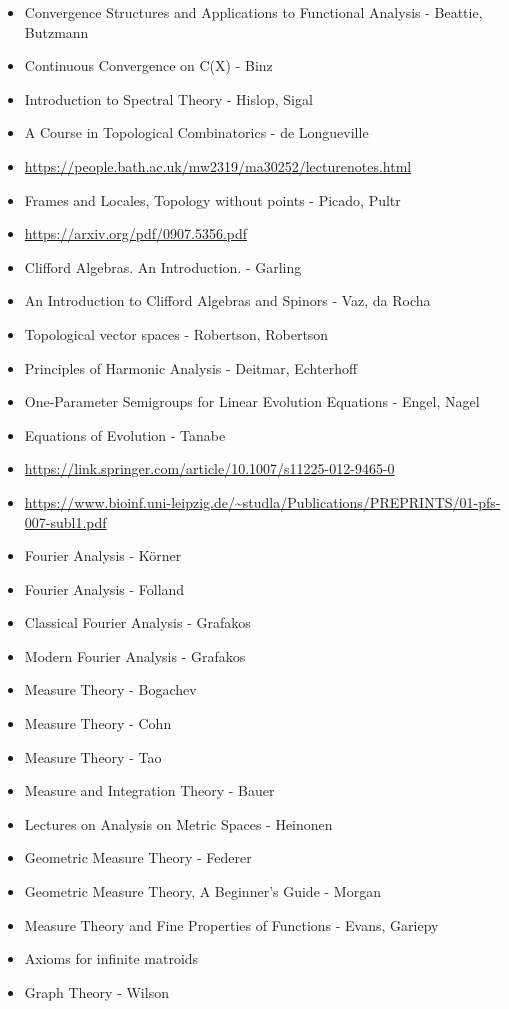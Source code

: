 \documentclass{report}
\begin{document}
\begin{itemize}
\item Convergence Structures and Applications to Functional Analysis - Beattie, Butzmann
\item Continuous Convergence on C(X) - Binz
\item Introduction to Spectral Theory - Hislop, Sigal
\item A Course in Topological Combinatorics - de Longueville
\item \url{https://people.bath.ac.uk/mw2319/ma30252/lecturenotes.html}
\item Frames and Locales, Topology without points - Picado, Pultr
\item \url{https://arxiv.org/pdf/0907.5356.pdf}
\item Clifford Algebras. An Introduction. - Garling
\item An Introduction to Clifford Algebras and Spinors - Vaz, da Rocha
\item Topological vector spaces - Robertson, Robertson
\item Principles of Harmonic Analysis - Deitmar, Echterhoff
\item One-Parameter Semigroups for Linear Evolution Equations - Engel, Nagel
\item Equations of Evolution - Tanabe
\item \url{https://link.springer.com/article/10.1007/s11225-012-9465-0}
\item \url{https://www.bioinf.uni-leipzig.de/~studla/Publications/PREPRINTS/01-pfs-007-subl1.pdf}
\item Fourier Analysis - Körner
\item Fourier Analysis - Folland
\item Classical Fourier Analysis - Grafakos
\item Modern Fourier Analysis - Grafakos
\item Measure Theory - Bogachev
\item Measure Theory - Cohn
\item Measure Theory - Tao
\item Measure and Integration Theory - Bauer
\item Lectures on Analysis on Metric Spaces - Heinonen
\item Geometric Measure Theory - Federer
\item Geometric Measure Theory, A Beginner's Guide - Morgan
\item Measure Theory and Fine Properties of Functions - Evans, Gariepy
\item Axioms for infinite matroids
\item Graph Theory - Wilson
\end{itemize}
\end{document}
